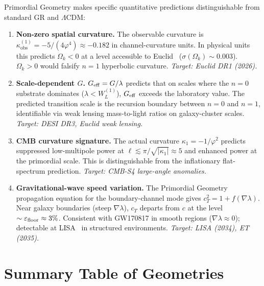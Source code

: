 \documentclass[prd,twocolumn,preprintnumbers,amsmath,amssymb]{revtex4-2}
\newcommand{\phig}{\varphi}
\newcommand{\WL}{W_{L}}
\newcommand{\kobs}{\kappa_{\mathrm{obs}}}
\begin{document}
Primordial Geometry makes specific quantitative predictions distinguishable from
standard GR and $\Lambda$CDM:

\begin{enumerate}
  \item \textbf{Non-zero spatial curvature.}  The observable curvature is
        $\kobs^{(1)} = -5/(4\phig^4) \approx -0.182$ in channel-curvature units.
        In physical units this predicts $\Omega_k < 0$ at a level accessible to
        Euclid~\cite{Euclid2022} ($\sigma(\Omega_k) \sim 0.003$).  $\Omega_k >
        0$ would falsify $n=1$ hyperbolic curvature.
        \textit{Target: Euclid DR1 (2026).}

  \item \textbf{Scale-dependent $G$.}  $G_{\rm eff} = G/\lambda$ predicts that
        on scales where the $n=0$ substrate dominates ($\lambda < \WL^{(1)}$),
        $G_{\rm eff}$ exceeds the laboratory value.  The predicted transition
        scale is the recursion boundary between $n=0$ and $n=1$, identifiable
        via weak lensing mass-to-light ratios on galaxy-cluster scales.
        \textit{Target: DESI DR3, Euclid weak lensing.}

  \item \textbf{CMB curvature signature.}  The actual curvature $\kappa_1 =
        -1/\phig^2$ predicts suppressed low-multipole power at $\ell \lesssim
        \pi/\sqrt{|\kappa_1|} \approx 5$ and enhanced power at the primordial
        scale.  This is distinguishable from the inflationary flat-spectrum
        prediction.
        \textit{Target: CMB-S4 large-angle anomalies.}

  \item \textbf{Gravitational-wave speed variation.}  The Primordial Geometry
        propagation equation for the boundary-channel mode gives $c_T^2 = 1 +
        f(\nabla\lambda)$.  Near galaxy boundaries (steep $\nabla\lambda$),
        $c_T$ departs from $c$ at the level~$\sim\varepsilon_{\rm floor} \approx
        3\%$.  Consistent with GW170817 in smooth regions ($\nabla\lambda\approx
        0$); detectable at LISA~\cite{LISA2017} in structured environments.
        \textit{Target: LISA (2034), ET (2035).}
\end{enumerate}

\section{Summary Table of Geometries}
\label{sec:table}
\end{document}
